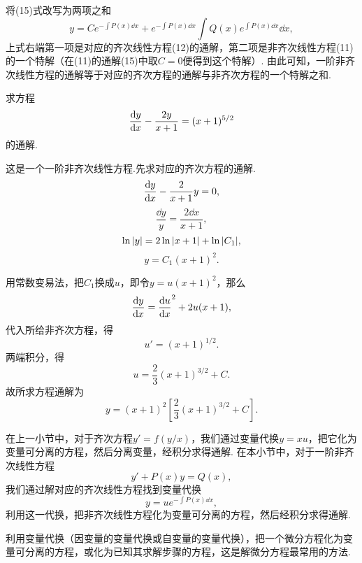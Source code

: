 将(15)式改写为两项之和\[
y = C e^{ -\int P(x) \dd{x} } + e^{ -\int P(x) \dd{x} } \int Q(x) e^{ \int P(x) \dd{x} } \dd{x},
\]上式右端第一项是对应的齐次线性方程(12)的通解，第二项是非齐次线性方程(11)的一个特解（在(11)的通解(15)中取\(C=0\)便得到这个特解）.
由此可知，一阶非齐次线性方程的通解等于对应的齐次方程的通解与非齐次方程的一个特解之和.

\begin{example}
求方程\[
\dv{y}{x} - \frac{2y}{x+1} = (x+1)^{5/2}
\]的通解.
\begin{solution}
这是一个一阶非齐次线性方程.先求对应的齐次方程的通解.\[
\dv{y}{x} - \frac{2}{x+1} y = 0,
\]\[
\frac{\dd{y}}{y} = \frac{2 \dd{x}}{x+1},
\]\[
\ln\abs{y} = 2\ln\abs{x+1}+ \ln\abs{C_1},
\]\[
y = C_1 (x+1)^2.
\]

用常数变易法，把\(C_1\)换成\(u\)，即令\(y = u(x+1)^2\)，那么\[
\dv{y}{x} = \dv{u}{x} (x+1)^2 + 2u(x+1),
\]代入所给非齐次方程，得\[
u' = (x+1)^{1/2}.
\]两端积分，得\[
u = \frac{2}{3} (x+1)^{3/2} + C.
\]故所求方程通解为\[
y = (x+1)^2 \left[
\frac{2}{3} (x+1)^{3/2} + C
\right].
\]
\end{solution}
\end{example}

在上一小节中，对于齐次方程\(y' = f(y/x)\)，我们通过变量代换\(y = xu\)，把它化为变量可分离的方程，然后分离变量，经积分求得通解.
在本小节中，对于一阶非齐次线性方程\[
y' + P(x) y = Q(x),
\]我们通过解对应的齐次线性方程找到变量代换\[
y = u e^{- \int P(x) \dd{x}},
\]利用这一代换，把非齐次线性方程化为变量可分离的方程，然后经积分求得通解.

利用变量代换（因变量的变量代换或自变量的变量代换），把一个微分方程化为变量可分离的方程，或化为已知其求解步骤的方程，这是解微分方程最常用的方法.

